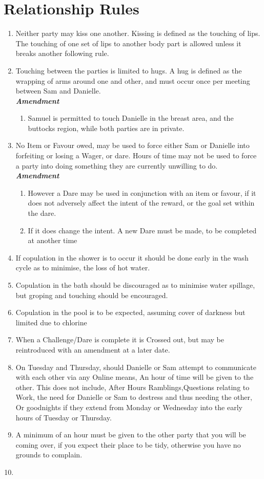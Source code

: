 
 \section{Relationship Rules}
\begin{enumerate}
  \item Neither party may kiss one another. Kissing is defined as the touching of lips. The touching of one set of lips to another
   body part is allowed unless it breaks another following rule.
  \item Touching between the parties is limited to hugs. A hug is defined as the wrapping of arms around one and other, and
   must occur once per meeting between Sam and Danielle.
   \\\textbf{\emph{Amendment}}
  \begin{enumerate}
    \item Samuel is permitted to touch Danielle in the breast area, and the buttocks region, while both parties are in private. 
  \end{enumerate}
  \item  No Item or Favour owed, may be used to force either Sam or Danielle into forfeiting or losing a Wager, or dare. 
  Hours of time may not be used to force a party into doing something they are currently unwilling to do. 
  \\ \textbf{\emph{Amendment}}
  \begin{enumerate}
    \item However a Dare may be used in conjunction with an item or favour, if it does not adversely affect the intent 
    of the reward, or the goal set within the dare.
    \item  If it does change the intent. A new Dare must be made, to be completed at another time
  \end{enumerate}
  \item If copulation in the shower is to occur it should be done early in the wash cycle as to minimise, the loss of hot water.
  \item Copulation in the bath should be discouraged as to minimise water spillage, but groping and touching should be encouraged.
  \item Copulation in the pool is to be expected, assuming cover of darkness but limited due to chlorine
  \item When a Challenge/Dare is complete it is Crossed out, but may be reintroduced with an amendment at a later date.
  \item On Tuesday and Thursday, should Danielle or Sam attempt to communicate with each other via any Online means, 
  An hour of time will be given to the other. This does not include, After Hours Ramblings,Questions relating to Work, 
  the need for Danielle or Sam to destress and thus needing the other, Or goodnights if they extend from Monday or Wednesday 
  into the early hours of Tuesday or Thursday.
  \item A minimum of an hour must be given to the other party that you will be coming over, if you expect their place to be tidy,
  otherwise you have no grounds to complain.
  \item 
\end{enumerate}
 




 

 

 